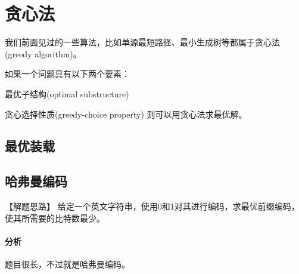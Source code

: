 \chapter{贪心法}
我们前面见过的一些算法，比如单源最短路径、最小生成树等都属于贪心法(greedy algorithm)。

如果一个问题具有以下两个要素：
\begindot
\item 最优子结构(optimal substructure)
\item 贪心选择性质(greedy-choice property)
\myenddot
则可以用贪心法求最优解。


\section{最优装载} %


\section{哈弗曼编码} %
【解题思路】
给定一个英文字符串，使用0和1对其进行编码，求最优前缀编码，使其所需要的比特数最少。

\subsubsection{分析}
题目很长，不过就是哈弗曼编码。

